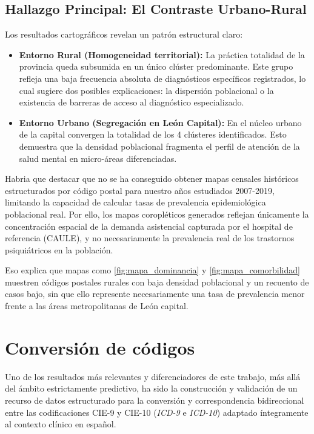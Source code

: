 \documentclass[12pt,a4paper,onecolumn,oneside]{report}
\begin{document}
\subsection{Hallazgo Principal: El Contraste Urbano-Rural}
Los resultados cartográficos revelan un patrón estructural claro:
\begin{itemize}
    \item \textbf{Entorno Rural (Homogeneidad territorial):} La práctica totalidad de la provincia queda subsumida en un único clúster predominante. Este grupo refleja una baja frecuencia absoluta de diagnósticos específicos registrados, lo cual sugiere dos posibles explicaciones: la dispersión poblacional o la existencia de barreras de acceso al diagnóstico especializado.
    \item \textbf{Entorno Urbano (Segregación en León Capital):} En el núcleo urbano de la capital convergen la totalidad de los 4 clústeres identificados. Esto demuestra que la densidad poblacional fragmenta el perfil de atención de la salud mental en micro-áreas diferenciadas.
\end{itemize}

Habria que destacar que no se ha conseguido obtener mapas censales históricos estructurados por código postal para nuestro años estudiados 2007-2019, limitando la capacidad de calcular tasas de prevalencia epidemiológica poblacional real. Por ello, los mapas coropléticos generados reflejan únicamente la concentración espacial de la demanda asistencial capturada por el hospital de referencia (CAULE), y no necesariamente la prevalencia real de los trastornos psiquiátricos en la población.

Eso explica que mapas como \ref{fig:mapa_dominancia} y \ref{fig:mapa_comorbilidad} muestren códigos postales rurales con baja densidad poblacional y un recuento de casos bajo, sin que ello represente necesariamente una tasa de prevalencia menor frente a las áreas metropolitanas de León capital.

\section{Conversión de códigos}

Uno de los resultados más relevantes y diferenciadores de este trabajo, más allá del ámbito estrictamente predictivo, ha sido la construcción y validación de un recurso de datos estructurado para la conversión y correspondencia bidireccional entre las codificaciones CIE-9 y CIE-10 (\textit{ICD-9} e \textit{ICD-10}) adaptado íntegramente al contexto clínico en español.
\end{document}
